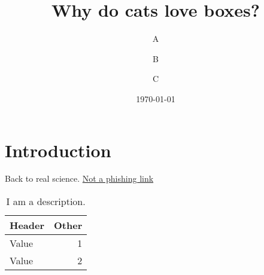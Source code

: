 \documentclass[]{report}
\title{Why do cats love boxes?}
\author{A \and B \and C}
\date{\today}
\begin{document}
\maketitle

\tableofcontents
\listoffigures
\listoftables

\pagebreak

\section{Introduction}
Back to real science. \href{https://archive.org/}{Not a phishing link}

\begin{table}
\begin{tabular}{lr}  
\toprule
Header & Other \\
\midrule
Value & 1 \\
Value & 2 \\
\bottomrule
\end{tabular}
\caption[Caption name]{I am a description.}
\label{table:table_name}
\end{table}
\end{document}
